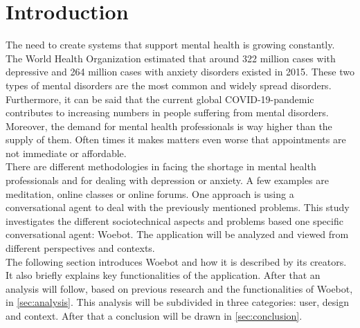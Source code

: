\section{Introduction}
The need to create systems that support mental health is growing constantly.
The World Health Organization estimated that around 322 million cases with depressive and 264 million cases with anxiety disorders existed in 2015\cite{who2017}.
These two types of mental disorders are the most common and widely spread disorders.
Furthermore, it can be said that the current global COVID-19-pandemic contributes to increasing numbers in people suffering from mental disorders\cite{corona-mental}.
Moreover, the demand for mental health professionals is way higher than the supply of them\cite{indian-shortage, rural-shortage}.
Often times it makes matters even worse that appointments are not immediate or affordable.\\

There are different methodologies in facing the shortage in mental health professionals and for dealing with depression or anxiety.
A few examples are meditation, online classes or online forums.
One approach is using a conversational agent to deal with the previously mentioned problems.
This study investigates the different sociotechnical aspects and problems based one specific conversational agent: Woebot\cite{woebot-main}.
The application will be analyzed and viewed from different perspectives and contexts.\\

The following section introduces Woebot and how it is described by its creators.
It also briefly explains key functionalities of the application.
After that an analysis will follow, based on previous research and the functionalities of Woebot, in \autoref{sec:analysis}.
This analysis will be subdivided in three categories: user, design and context.
After that a conclusion will be drawn in \autoref{sec:conclusion}.
